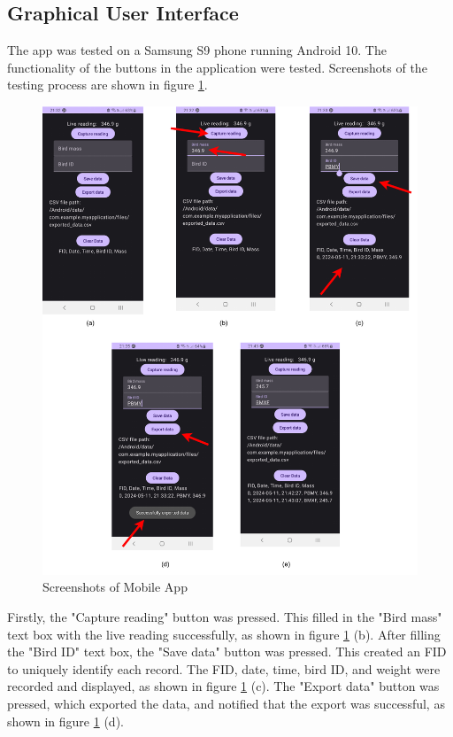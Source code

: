 \documentclass[class=report,11pt,crop=false]{standalone}
\begin{document}
		\subsection{Graphical User Interface}
			The app was tested on a Samsung S9 phone running Android 10.
			The functionality of the buttons in the application were tested. Screenshots of the testing process are shown in figure \ref{fig:screenshots-of-mobile-app}.
			
			\begin{figure}[h!]
				\centering
				\includegraphics[width=\linewidth]{"Figures/Screenshots of Mobile App.drawio"}
				\caption{Screenshots of Mobile App}
				\label{fig:screenshots-of-mobile-app}
			\end{figure}
			
			Firstly, the "Capture reading" button was pressed. This filled in the "Bird mass" text box with the live reading successfully, as shown in figure \ref{fig:screenshots-of-mobile-app} (b). After filling the "Bird ID" text box, the "Save data" button was pressed. This created an FID to uniquely identify each record. The FID, date, time, bird ID, and weight were recorded and displayed, as shown in figure \ref{fig:screenshots-of-mobile-app} (c). The "Export data" button was pressed, which exported the data, and notified that the export was successful, as shown in figure \ref{fig:screenshots-of-mobile-app} (d).  
				
\end{document}
